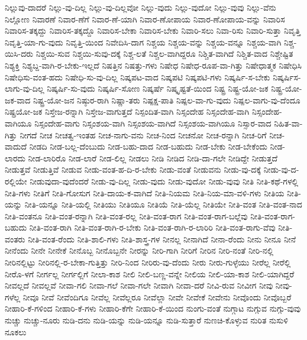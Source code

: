 {ನಿಲ್ಲುವು-ದಾದರೆ
ನಿಲ್ಲು-ವು-ದಿಲ್ಲ
ನಿಲ್ಲು-ವು-ದಿಲ್ಲವೋ
ನಿಲ್ಲು-ವುದು
ನಿಲ್ಲು-ವುದೋ
ನಿಲ್ಲು-ವುವು
ನಿಲ್ಲು-ವೆನು
ನಿಲ್ಲೋಣ
ನಿವಾರಣೆ
ನಿವಾರ-ಣೆಗೆ
ನಿವಾರ-ಣೆ-ಯಾಗಿ
ನಿವಾರ-ಣೋಪಾಯ
ನಿವಾರ-ಣೋಪಾಯ-ವನ್ನು
ನಿವಾರಿಸ
ನಿವಾರಿಸ-ತಕ್ಕದ್ದು
ನಿವಾರಿಸ-ತಕ್ಕದ್ದೊ
ನಿವಾರಿಸ-ಬೇಕಾ
ನಿವಾರಿಸ-ಬೇಕು
ನಿವಾರಿ-ಸಲು
ನಿವಾ-ರಿಸು
ನಿವಾರಿ-ಸುತ್ತಾ
ನಿವೃತ್ತಿ
ನಿವೃತ್ತಿ-ಯಾ-ಗು-ವುದು
ನಿವೃತ್ತಿ-ಯಿಂದ
ನಿವೇದಿಸಿ-ದಾಗ
ನಿಶ್ಚಯ
ನಿಶ್ಚಯ-ವನ್ನು
ನಿಶ್ಚಯ-ವನ್ನೂ
ನಿಶ್ಚಯ-ವಾಗಿ
ನಿಶ್ಚ-ಯಿಸಿ-ದರು
ನಿಶ್ಚಯಿ-ಸುವ
ನಿಶ್ಚಯಿ-ಸುವು-ದಕ್ಕೆ
ನಿಶ್ಚ-ಲತೆ
ನಿಶ್ಚಲ-ವಾಗಿದ್ದರೂ
ನಿಶ್ಚಿತ-ವಾಗಿದೆ
ನಿಶ್ಚಿತ-ವಾದ
ನಿಶ್ಚೇಷ್ಟಿತ
ನಿಶ್ಯಕ್ತಿ
ನಿಶ್ಯಬ್ದ-ವಾಗಿ-ರ-ಬೇಕು-ಇಲ್ಲದೆ
ನಿಷತ್ತಿನ
ನಿಷತ್ತು-ಗಳು
ನಿಷೇಧ
ನಿಷೇಧ-ರೂಪ-ವಾ-ಗಿತ್ತು
ನಿಷೇಧಾತ್ಮಕ
ನಿಷೇಧಿಸಿ
ನಿಷೇಧಿಸು-ವಂತ-ಹದು
ನಿಷೇಧಿ-ಸು-ವು-ದಿಲ್ಲ
ನಿಷ್ಕಪಟ-ವಾದ
ನಿಷ್ಕಪಟಿ
ನಿಷ್ಕಪಟಿ-ಗಳು
ನಿಷ್ಕರ್ಷಿ-ಸ-ಬೇಕು
ನಿಷ್ಕರ್ಷಿಸ-ಲಾಗು-ವು-ದಿಲ್ಲ
ನಿಷ್ಕರ್ಷಿ-ಸು-ವುದು
ನಿಷ್ಕರ್ಷಿ-ಸೋಣ
ನಿಷ್ಕರ್ಷೆ
ನಿಷ್ಕೃಷ್ಟತೆ-ಯಿಂದ
ನಿಷ್ಟ್ರ
ನಿಷ್ಟ್ರ-ಯೋ-ಜಕ
ನಿಷ್ಟ್ರ-ಯೋ-ಜಕ-ವಾದ
ನಿಷ್ಟ್ರ-ಯೋ-ಜನ
ನಿಷ್ಠುರ-ರಾಗಿ
ನಿಷ್ಣಾ-ತರು
ನಿಷ್ಪಕ್ಷ-ಪಾತಿ
ನಿಷ್ಪಲ-ವಾ-ಗು-ವುದು
ನಿಷ್ಪಲ-ವಾಗು-ವು-ದೆಂದೂ
ನಿಷ್ಪ್ರಯೋ-ಜಕ
ನಿಸ್ತೇಜ-ರನ್ನಾಗಿ
ನಿಸ್ತೇಜ-ವಾಗುತ್ತದೆ
ನಿಸ್ಪಂದಿತ-ವಾಗಿ
ನಿಸ್ಸಂದೇಹ
ನಿಸ್ಸಂದೇಹ-ವಾಗಿ
ನಿಸ್ಸಂದೇಹ-ವಾಗಿಯೂ
ನಿಸ್ಸಂದೇಹ-ವಾಗು
ನಿಸ್ಸಂಶಯ-ವಾಗಿ
ನಿಸ್ಸಂಶಯ-ವಾಗಿದೆ
ನಿಸ್ಸಂಶಯ-ವಾಗಿಯೂ
ನಿಸ್ಸಾರ-ವಾದ
ನಿಹಿತ-ವಾ-ಗಿತ್ತು
ನೀಗದೆ
ನೀಚ
ನೀಚತ್ವ-ಇಂತಹ
ನೀಚ-ನಾಗು-ವನು
ನೀಚ-ನಿಂದ
ನೀಚನೋ
ನೀಚ-ರನ್ನಾಗಿ
ನೀಚ-ರಿಗೆ
ನೀಚ-ವಾದುದೆ
ನೀಡದಿ
ನೀಡ-ಬಲ್ಲ-ದೆಂಬುದು
ನೀಡ-ಬಹು-ದಾದ
ನೀಡ-ಬಹುದು
ನೀಡ-ಬೇಕು
ನೀಡ-ಬೇಕೆಂದು
ನೀಡ-ಲಾರದು
ನೀಡ-ಲಾರಿರೊ
ನೀಡ-ಲಾರೆ
ನೀಡ-ಲಿಲ್ಲ
ನೀಡಲು
ನೀಡಿ
ನೀಡಿದ
ನೀಡಿ-ದಾ-ಗಲೇ
ನೀಡಿದ್ದೇ
ನೀಡುತ್ತದೆ
ನೀಡುತ್ತವೆ
ನೀಡುತ್ತಿವೆ
ನೀಡುವ
ನೀಡು-ವಂತ-ಹ-ದಿ-ರ-ಬೇಕು
ನೀಡು-ವಂತೆ
ನೀಡುವನು
ನೀಡು-ವು-ದಕ್ಕೆ
ನೀಡು-ವು-ದ-ರಲ್ಲಿಯೇ
ನೀಡುವುದಾ-ವುದೆಂದರೆ
ನೀಡು-ವು-ದಿಲ್ಲ
ನೀಡು-ವುದು
ನೀಡು-ವುದೋ
ನೀಡು-ವುವು
ನೀತಿ
ನೀತಿ-ಕಥೆ-ಗಳಲ್ಲಿ
ನೀತಿ-ಗಳು
ನೀತಿಗೆ
ನೀತಿ-ಗೋಸುಗ
ನೀತಿ-ದಾಯ-ಕ-ವಾಗಿದೆ
ನೀತಿ-ನಿಯಮ
ನೀತಿ-ನಿಯ-ಮಾ-ವಳಿ-ಗಳು
ನೀತಿಯ
ನೀತಿ-ಯನ್ನು
ನೀತಿ-ಯನ್ನೂ
ನೀತಿ-ಯಲ್ಲಿ
ನೀತಿಯು
ನೀತಿಯೂ
ನೀತಿಯೆ
ನೀತಿ-ಯೆಲ್ಲ
ನೀತಿಯೇ
ನೀತಿ-ವಂತ
ನೀತಿ-ವಂತ-ನಾದ
ನೀತಿ-ವಂತನೂ
ನೀತಿ-ವಂತ-ರನ್ನಾಗಿ
ನೀತಿ-ವಂತ-ರಲ್ಲ
ನೀತಿ-ವಂತ-ರಾಗ
ನೀತಿ-ವಂತ-ರಾಗ-ಬಲ್ಲೆವು
ನೀತಿ-ವಂತ-ರಾಗ-ಬಹುದು
ನೀತಿ-ವಂತ-ರಾಗಿ
ನೀತಿ-ವಂತ-ರಾಗಿ-ರ-ಬೇಕು
ನೀತಿ-ವಂತ-ರಾಗಿ-ರ-ಲಾರಿರಿ
ನೀತಿ-ವಂತ-ರಾಗು-ವೆವು
ನೀತಿ-ವಂತರು
ನೀತಿ-ವಂತ-ರೆಂದು
ನೀತಿ-ಶಾಲಿ-ಗಳು
ನೀತಿ-ಶಾಸ್ತ್ರ-ಗಳ
ನೀನಲ್ಲ
ನೀನಾಗಿದೆ
ನೀನಾ-ರೆಂದು
ನೀನು
ನೀನೂ
ನೀನೆ
ನೀನೆಂದು
ನೀನೇ
ನೀನೇಕೆ
ನೀನೊಬ್ಬ
ನೀನೊಬ್ಬನೇ
ನೀರನ್ನು
ನೀರಿ-ಗಾಗಿ
ನೀರಿಗೆ
ನೀರಿನ
ನೀರಿ-ನಂತೆ
ನೀರಿ-ನಲ್ಲಿ
ನೀರಿನಲ್ಲಿಟ್ಟು
ನೀರಿನಲ್ಲಿ-ರ-ಬೇಕಾ-ಗುತ್ತಿತ್ತು
ನೀರಿ-ನಿಂದ
ನೀರಿರು-ವು-ದೆಂದು
ನೀರು
ನೀರು-ಗುಳ್ಳೆಯು
ನೀರೆಲ್ಲ
ನೀರೆಲ್ಲಿ
ನೀರೊ-ಳಗೆ
ನೀರ್ಗಲ್ಲ
ನೀರ್ಗಲ್ಲಿಗೆ
ನೀಲಾ-ಕಾಶ
ನೀಲಿ
ನೀಲಿ-ಬಣ್ಣ-ವನ್ನೇ
ನೀಲಿಯ
ನೀಲಿ-ಯಾ-ಕಾಶ
ನೀಲಿ-ಯಾಗಿದ್ದರೆ
ನೀವಲ್ಲದೆ
ನೀವಲ್ಲವೆ
ನೀವಾ-ಗಲಿ
ನೀವಾ-ಗಲೆ
ನೀವಾ-ಗಲೇ
ನೀವಾಗಿ
ನೀವಾ-ದರೆ
ನೀವಿ-ರುವ
ನೀವೀಗ
ನೀವು
ನೀವು-ಗಳೆಲ್ಲ
ನೀವೂ
ನೀವೆ
ನೀವೆಂದಿಗೂ
ನೀವೆಲ್ಲ
ನೀವೆಲ್ಲರೂ
ನೀವೆಲ್ಲಾ
ನೀವೇ
ನೀವೇಕೆ
ನೀವೇನು
ನೀವೊಂದು
ನೀವೊಬ್ಬರೆ
ನೀಹಾರಿ-ಕೆ-ಗಳಿಂದ
ನೀಹಾರಿ-ಕೆ-ಗಳು
ನೀಹಾರಿ-ಕೆಗೇ
ನೀಹಾರಿ-ಕೆ-ಯಿಂದ
ನುಂಗು-ವಂತೆ
ನುಗ್ಗಾಟ
ನುಗ್ಗುವ
ನುಗ್ಗು-ವುವು
ನುಚ್ಚು
ನುಚ್ಚು-ನೂರು
ನುಡಿ-ದನು
ನುಡಿ-ಯನ್ನು
ನುಡಿ-ಯನ್ನೂ
ನುಡಿ-ಸುತ್ತಾರೆ
ನುಣಚಿ-ಕೊಳ್ಳುವ
ನುರಿತ
ನುಸುಳಿ
ನೂಕಲು
}
